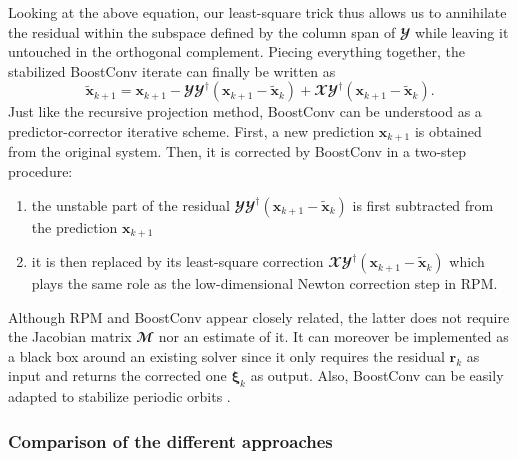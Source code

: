     Looking at the above equation, our least-square trick thus allows us to annihilate the residual within the subspace defined by the column span of $\mathbfcal{Y}$ while leaving it untouched in the orthogonal complement. Piecing everything together, the stabilized BoostConv iterate can finally be written as
    \begin{equation}
      \tilde{\mathbf{x}}_{k+1} = \mathbf{x}_{k+1} - \mathbfcal{Y} \mathbfcal{Y}^{\dagger}\left( \mathbf{x}_{k+1} - \tilde{\mathbf{x}}_k \right) + \mathbfcal{X} \mathbfcal{Y}^{\dagger} \left( \mathbf{x}_{k+1} - \tilde{\mathbf{x}}_k \right).
    \end{equation}
    Just like the recursive projection method, BoostConv can be understood as a predictor-corrector iterative scheme. First, a new prediction $\mathbf{x}_{k+1}$ is obtained from the original system. Then, it is corrected by BoostConv in a two-step procedure:
    \begin{enumerate}
      \item the unstable part of the residual $\mathbfcal{YY}^{\dagger}\left( \mathbf{x}_{k+1} - \tilde{\mathbf{x}}_k \right)$ is first subtracted from the prediction $\mathbf{x}_{k+1}$
      \item it is then replaced by its least-square correction $\mathbfcal{XY}^{\dagger} \left( \mathbf{x}_{k+1} - \tilde{\mathbf{x}}_k \right)$ which plays the same role as the low-dimensional Newton correction step in RPM.
    \end{enumerate}
    Although RPM and BoostConv appear closely related, the latter does not require the Jacobian matrix $\mathbfcal{M}$ nor an estimate of it. It can moreover be implemented as a black box around an existing solver since it only requires the residual $\mathbf{r}_k$ as input and returns the corrected one $\boldsymbol{\xi}_k$ as output. Also, BoostConv can be easily adapted to stabilize periodic orbits \cite{citro2017efficient}.

    \subsubsection{Comparison of the different approaches}
    \label{subsubsec: numerics -- fixed points comparison}

